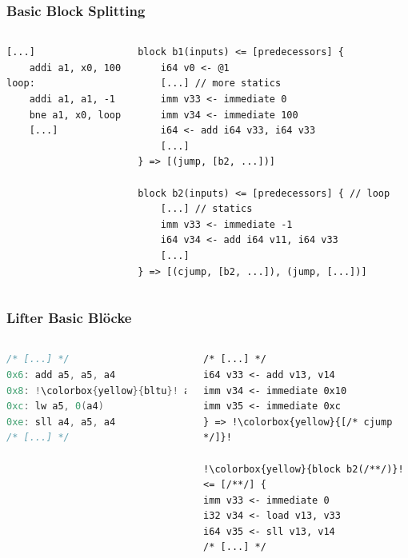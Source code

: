 
\begin{frame}[fragile]
    \frametitle{Basic Block Splitting}{}
    \begin{columns}[c]
        \begin{lstlisting}[language=rv64]
    [...]
    addi a1, x0, 100
loop:
    addi a1, a1, -1
    bne a1, x0, loop
    [...]
        \end{lstlisting}


        \begin{lstlisting}[language=SbtIr]
block b1(inputs) <= [predecessors] {
    i64 v0 <- @1
    [...] // more statics
    imm v33 <- immediate 0
    imm v34 <- immediate 100
    i64 <- add i64 v33, i64 v33
    [...]
} => [(jump, [b2, ...])]

block b2(inputs) <= [predecessors] { // loop
    [...] // statics
    imm v33 <- immediate -1
    i64 v34 <- add i64 v11, i64 v33
    [...]
} => [(cjump, [b2, ...]), (jump, [...])]
    \end{lstlisting}
    \end{columns}

\end{frame}
\clearpage

\begin{frame}[fragile]
    \frametitle{Lifter Basic Blöcke}{}
    \begin{columns}[c]
        \begin{lstlisting}[language=c, escapechar=!]
/* [...] */
0x6: add a5, a5, a4
0x8: !\colorbox{yellow}{bltu}! a5, a4, 10
0xc: lw a5, 0(a4)
0xe: sll a4, a5, a4
/* [...] */
        \end{lstlisting}
        \begin{lstlisting}[language=SbtIr, escapechar=!]
/* [...] */
i64 v33 <- add v13, v14
imm v34 <- immediate 0x10
imm v35 <- immediate 0xc
} => !\colorbox{yellow}{[/* cjump */]}!

!\colorbox{yellow}{block b2(/**/)}! <= [/**/] {
imm v33 <- immediate 0
i32 v34 <- load v13, v33
i64 v35 <- sll v13, v14
/* [...] */
        \end{lstlisting}
    \end{columns}
\end{frame}
\clearpage

